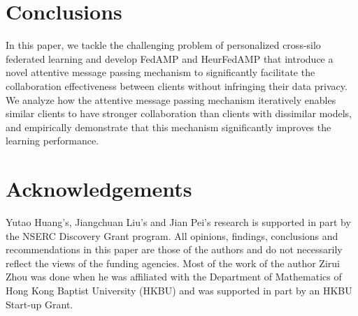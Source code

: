 
\section{Conclusions}
In this paper, we tackle the challenging problem of personalized cross-silo federated learning and develop {FedAMP} and {HeurFedAMP} that introduce a novel attentive message passing mechanism to significantly facilitate the collaboration effectiveness between clients without infringing their data privacy.
We analyze how the attentive message passing mechanism iteratively enables similar clients to have stronger collaboration than clients with dissimilar models, and empirically demonstrate that this mechanism significantly improves the learning performance.


\section*{Acknowledgements}
Yutao Huang's, Jiangchuan Liu's and Jian Pei's research is supported in part by the NSERC Discovery Grant program.
All opinions, findings, conclusions and recommendations in this paper are those of the authors and do not necessarily reflect the views of the funding agencies. Most of the work of the author Zirui Zhou was done when he was affiliated with the Department of Mathematics of Hong Kong Baptist University (HKBU) and was supported in part by an HKBU Start-up Grant.

